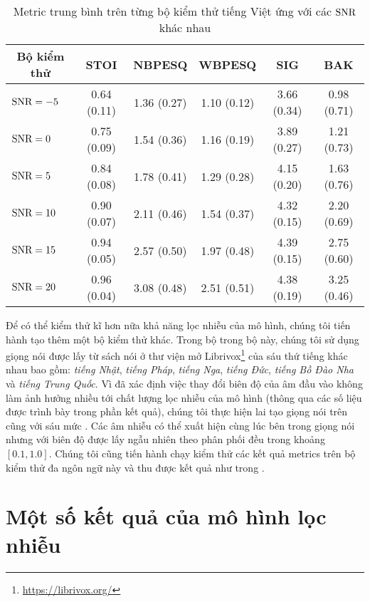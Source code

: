 		\begin{table}[h]
			\centering
			\begin{tabular}{l c c c c c}
				\hline
				\multicolumn{1}{c}{\textbf{Bộ kiểm thử}}	& \textbf{STOI}	& \textbf{NBPESQ}	& \textbf{WBPESQ}	& \textbf{SIG}	& \textbf{BAK} \\
				\hline
				$\text{SNR}=-5$        & 0.64 (0.11)   & 1.36 (0.27)   & 1.10 (0.12)   & 3.66 (0.34)   & 0.98 (0.71) \\
				$\text{SNR}=0$         & 0.75 (0.09)   & 1.54 (0.36)   & 1.16 (0.19)   & 3.89 (0.27)   & 1.21 (0.73) \\
				$\text{SNR}=5$         & 0.84 (0.08)   & 1.78 (0.41)   & 1.29 (0.28)   & 4.15 (0.20)   & 1.63 (0.76) \\
				$\text{SNR}=10$        & 0.90 (0.07)   & 2.11 (0.46)   & 1.54 (0.37)   & 4.32 (0.15)   & 2.20 (0.69) \\
				$\text{SNR}=15$        & 0.94 (0.05)   & 2.57 (0.50)   & 1.97 (0.48)   & 4.39 (0.15)   & 2.75 (0.60) \\
				$\text{SNR}=20$        & 0.96 (0.04)   & 3.08 (0.48)   & 2.51 (0.51)   & 4.38 (0.19)   & 3.25 (0.46) \\
				\hline
			\end{tabular}
			\caption{Metric trung bình trên từng bộ kiểm thử tiếng Việt ứng với các $\text{SNR}$ khác nhau}
			\label{re::baseline}
		\end{table}
	
	Để có thể kiểm thử kĩ hơn nữa khả năng lọc nhiễu của mô hình, chúng tôi tiến hành tạo thêm một bộ kiểm thử khác. Trong bộ trong bộ này, chúng tôi sử dụng giọng nói được lấy từ sách nói ở thư viện mở Librivox\footnote{\url{https://librivox.org/}} của sáu thứ tiếng khác nhau bao gồm: \textit{tiếng Nhật}, \textit{tiếng Pháp}, \textit{tiếng Nga}, \textit{tiếng Đức}, \textit{tiếng Bồ Đào Nha} và \textit{tiếng Trung Quốc}. Vì đã xác định việc thay đổi biên độ của âm đầu vào không làm ảnh hưởng nhiều tới chất lượng lọc nhiễu của mô hình (thông qua các số liệu được trình bày trong phần kết quả), chúng tôi thực hiện lai tạo giọng nói trên cũng với sáu mức . Các âm nhiễu có thể xuất hiện cùng lúc bên trong giọng nói nhưng với biên độ được lấy ngẫu nhiên theo phân phối đều trong khoảng $[0.1, 1.0]$. Chúng tôi cũng tiến hành chạy kiểm thử các kết quả metrics trên bộ kiểm thử đa ngôn ngữ này và thu được kết quả như trong .

\section{Một số kết quả của mô hình lọc nhiễu}
	
